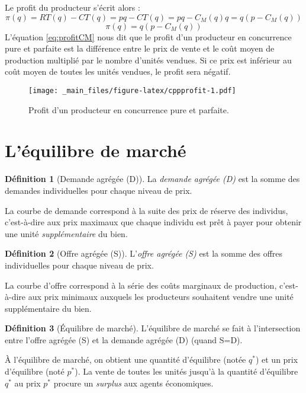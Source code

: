 \documentclass[
  a4paper,
]{book}
\theoremstyle{definition}
\newtheorem{definition}{Définition}[chapter]
\theoremstyle{definition}
\theoremstyle{definition}
\theoremstyle{definition}
\theoremstyle{remark}
\begin{document}
Le profit du producteur s'écrit alors :
\[\pi(q)=RT(q)-CT(q)=pq-CT(q)=pq-C_M(q)q=q(p-C_M(q))\]
\begin{equation}
\pi(q)=q(p-C_M(q))
\label{eq:profitCM}
\end{equation}
L'équation \eqref{eq:profitCM} nous dit que le profit d'un producteur en concurrence pure et parfaite est la différence entre le prix de vente et le coût moyen de production multiplié par le nombre d'unités vendues.
Si ce prix est inférieur au coût moyen de toutes les unités vendues, le profit sera négatif.

\begin{figure}
\centering
\texttt{[image: \_main\_files/figure-latex/cppprofit-1.pdf]}
\caption{\label{fig:cppprofit}Profit d'un producteur en concurrence pure et parfaite.}
\end{figure}

\hypertarget{luxe9quilibre-de-marchuxe9}{%
\section{L'équilibre de marché}\label{luxe9quilibre-de-marchuxe9}}

\begin{definition}[Demande agrégée (D)]
La \emph{demande agrégée (D)} est la somme des demandes individuelles pour chaque niveau de prix.
\end{definition}

La courbe de demande correspond à la suite des prix de réserve des individus, c'est-à-dire aux prix maximaux que chaque individu est prêt à payer pour obtenir une unité \emph{supplémentaire} du bien.

\begin{definition}[Offre agrégée (S)]
L'\emph{offre agrégée (S)} est la somme des offres individuelles pour chaque niveau de prix.
\end{definition}

La courbe d'offre correspond à la série des coûts marginaux de production, c'est-à-dire aux prix minimaux auxquels les producteurs souhaitent vendre une unité supplémentaire du bien.

\begin{definition}[Équilibre de marché]
L'équilibre de marché se fait à l'intersection entre l'offre agrégée (S) et la demande agrégée (D) (quand S=D).
\end{definition}

À l'équilibre de marché, on obtient une quantité d'équilibre (notée \(q^*\)) et un prix d'équilibre (noté \(p^*\)).
La vente de toutes les unités jusqu'à la quantité d'équilibre \(q^*\) au prix \(p^*\) procure un \emph{surplus} aux agents économiques.
\end{document}
